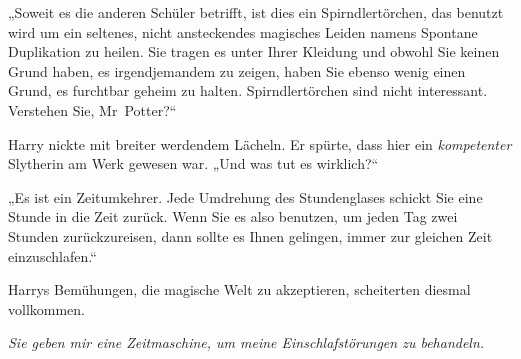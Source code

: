 „Soweit es die anderen Schüler betrifft, ist dies ein Spirndlertörchen, das benutzt wird um ein seltenes, nicht ansteckendes magisches Leiden namens Spontane Duplikation zu heilen. Sie tragen es unter Ihrer Kleidung und obwohl Sie keinen Grund haben, es irgendjemandem zu zeigen, haben Sie ebenso wenig einen Grund, es furchtbar geheim zu halten. Spirndlertörchen sind nicht interessant. Verstehen Sie, Mr~Potter?“%

Harry nickte mit breiter werdendem Lächeln. Er spürte, dass hier ein \emph{kompetenter} Slytherin am Werk gewesen war. „Und was tut es wirklich?“

„Es ist ein Zeitumkehrer. Jede Umdrehung des Stundenglases schickt Sie eine Stunde in die Zeit zurück. Wenn Sie es also benutzen, um jeden Tag zwei Stunden zurückzureisen, dann sollte es Ihnen gelingen, immer zur gleichen Zeit einzuschlafen.“

Harrys Bemühungen, die magische Welt zu akzeptieren, scheiterten diesmal vollkommen.

\emph{Sie geben mir eine Zeitmaschine, um meine Einschlafstörungen zu behandeln.}


